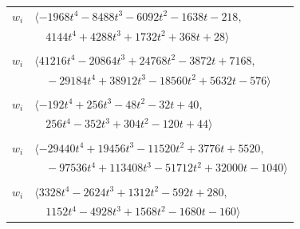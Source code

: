 \documentclass[11pt]{article}
\begin{document}
\begin{longtable}{@{}ll@{}}
$w_i$ & $\langle -1968t^{4}-8488t^{3}-6092t^{2}-1638t-218,$\\
 & $\quad 4144t^{4}+4288t^{3}+1732t^{2}+368t+28\rangle$\\
\addlinespace[2pt]
\multicolumn{2}{@{}p{0.97\textwidth}@{}}{$i=25$, $D_i=1$, $e_i=2$, $\rho_{ij}$: $1{:}3, \allowbreak 16{:}3, \allowbreak 21{:}3, \allowbreak 24{:}3, \allowbreak 35{:}1, \allowbreak 40{:}1, \allowbreak 42{:}3, \allowbreak 46{:}3, \allowbreak 51{:}1, \allowbreak 56{:}1, \allowbreak 62{:}3, \allowbreak 64{:}3, \allowbreak 68{:}1, \allowbreak 72{:}3$}\\
$w_i$ & $\langle 41216t^{4}-20864t^{3}+24768t^{2}-3872t+7168,$\\
 & $\quad -29184t^{4}+38912t^{3}-18560t^{2}+5632t-576\rangle$\\
\addlinespace[2pt]
\multicolumn{2}{@{}p{0.97\textwidth}@{}}{$i=26$, $D_i=1$, $e_i=1$, $\rho_{ij}$: $4{:}2, \allowbreak 5{:}1, \allowbreak 6{:}1, \allowbreak 14{:}1, \allowbreak 21{:}1, \allowbreak 29{:}2, \allowbreak 36{:}3, \allowbreak 43{:}2, \allowbreak 46{:}1, \allowbreak 52{:}2, \allowbreak 65{:}1$}\\
$w_i$ & $\langle -192t^{4}+256t^{3}-48t^{2}-32t+40,$\\
 & $\quad 256t^{4}-352t^{3}+304t^{2}-120t+44\rangle$\\
\addlinespace[2pt]
\multicolumn{2}{@{}p{0.97\textwidth}@{}}{$i=27$, $D_i=1$, $e_i=1$, $\rho_{ij}$: $1{:}2, \allowbreak 7{:}2, \allowbreak 13{:}3, \allowbreak 16{:}1, \allowbreak 18{:}2, \allowbreak 23{:}1, \allowbreak 28{:}1, \allowbreak 33{:}2, \allowbreak 36{:}3, \allowbreak 40{:}2, \allowbreak 47{:}3, \allowbreak 51{:}1, \allowbreak 62{:}2, \allowbreak 63{:}3, \allowbreak 67{:}1, \allowbreak 68{:}2, \allowbreak 73{:}3$}\\
$w_i$ & $\langle -29440t^{4}+19456t^{3}-11520t^{2}+3776t+5520,$\\
 & $\quad -97536t^{4}+113408t^{3}-51712t^{2}+32000t-1040\rangle$\\
\addlinespace[2pt]
\multicolumn{2}{@{}p{0.97\textwidth}@{}}{$i=28$, $D_i=1$, $e_i=2$, $\rho_{ij}$: $4{:}1, \allowbreak 5{:}1, \allowbreak 7{:}3, \allowbreak 17{:}2, \allowbreak 18{:}3, \allowbreak 27{:}3, \allowbreak 36{:}1, \allowbreak 47{:}3, \allowbreak 54{:}1, \allowbreak 62{:}1, \allowbreak 63{:}3, \allowbreak 68{:}3$}\\
$w_i$ & $\langle 3328t^{4}-2624t^{3}+1312t^{2}-592t+280,$\\
 & $\quad 1152t^{4}-4928t^{3}+1568t^{2}-1680t-160\rangle$\\

\end{longtable}
\end{document}
